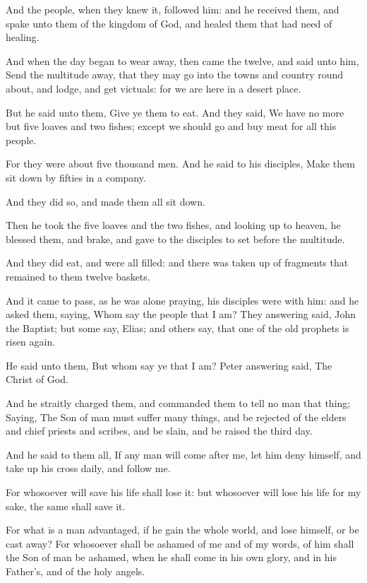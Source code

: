 \Verse And the people, when they knew it, followed him: and he received them, and spake unto them of the kingdom of God, and healed them that had need of healing.

\Verse And when the day began to wear away, then came the twelve, and said unto him, Send the multitude away, that they may go into the towns and country round about, and lodge, and get victuals: for we are here in a desert place.

\Verse But he said unto them, Give ye them to eat. And they said, We have no more but five loaves and two fishes; except we should go and buy meat for all this people.

\Verse For they were about five thousand men. And he said to his disciples, Make them sit down by fifties in a company.

\Verse And they did so, and made them all sit down.

\Verse Then he took the five loaves and the two fishes, and looking up to heaven, he blessed them, and brake, and gave to the disciples to set before the multitude.

\Verse And they did eat, and were all filled: and there was taken up of fragments that remained to them twelve baskets.

\Verse And it came to pass, as he was alone praying, his disciples were with him: and he asked them, saying, Whom say the people that I am?  \Verse They answering said, John the Baptist; but some say, Elias; and others say, that one of the old prophets is risen again.

\Verse He said unto them, But whom say ye that I am? Peter answering said, The Christ of God.

\Verse And he straitly charged them, and commanded them to tell no man that thing; \Verse Saying, The Son of man must suffer many things, and be rejected of the elders and chief priests and scribes, and be slain, and be raised the third day.

\Verse And he said to them all, If any man will come after me, let him deny himself, and take up his cross daily, and follow me.

\Verse For whosoever will save his life shall lose it: but whosoever will lose his life for my sake, the same shall save it.

\Verse For what is a man advantaged, if he gain the whole world, and lose himself, or be cast away?  \Verse For whosoever shall be ashamed of me and of my words, of him shall the Son of man be ashamed, when he shall come in his own glory, and in his Father's, and of the holy angels.

